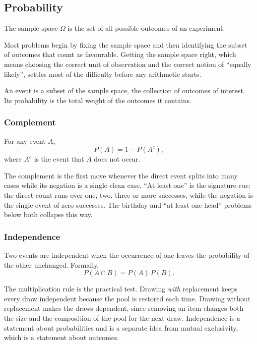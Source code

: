 \subsection{Probability}

\begin{definition}
The sample space $\Omega$ is the set of all possible outcomes of an experiment.
\end{definition}

Most problems begin by fixing the sample space and then identifying the subset of outcomes that count as favourable. Getting the sample space right, which means choosing the correct unit of observation and the correct notion of ``equally likely'', settles most of the difficulty before any arithmetic starts.

\begin{definition}[Event]
An event is a subset of the sample space, the collection of outcomes of interest. Its probability is the total weight of the outcomes it contains.
\end{definition}

\subsubsection{Complement}

\begin{keybox}[Complement]
For any event $A$,
\[
P(A) = 1 - P(A^c),
\]
where $A^c$ is the event that $A$ does not occur.
\end{keybox}

The complement is the first move whenever the direct event splits into many cases while its negation is a single clean case. ``At least one'' is the signature cue: the direct count runs over one, two, three or more successes, while the negation is the single event of zero successes. The birthday and ``at least one head'' problems below both collapse this way.

\subsubsection{Independence}

\begin{definition}[Independence]
Two events are independent when the occurrence of one leaves the probability of the other unchanged. Formally,
\[
P(A \cap B) = P(A)\,P(B).
\]
\end{definition}

The multiplication rule is the practical test. Drawing \textit{with} replacement keeps every draw independent because the pool is restored each time. Drawing without replacement makes the draws dependent, since removing an item changes both the size and the composition of the pool for the next draw. Independence is a statement about probabilities and is a separate idea from mutual exclusivity, which is a statement about outcomes.


